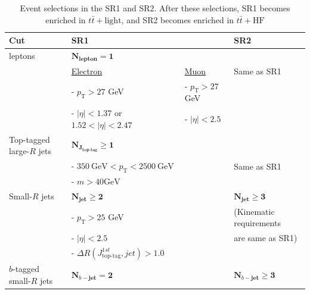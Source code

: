 \begin{table}[H]
  \centering
  \begin{tabular*}{170mm}{l|ll|l}
    \hline\hline
    Cut                       & SR1                                                         &                           & SR2\\
    \hline
    leptons                   & $\textbf{N}_{\textbf{lepton}}\mathbf{=1}$                   &                           & \\
                              & \underline{Electron}                                        & \underline{Muon}          & Same as SR1\\
                              &  - $p_{\text{T}}>27$ GeV                                    &  - $p_{\text{T}}>27$ GeV  & \\
                              &  - $|\eta|<1.37$ or $1.52<|\eta|<2.47$                      &  - $|\eta|<2.5$           & \\
    \hline
    Top-tagged large-$R$ jets & $\textbf{N}_{\mathbf{J}_{\textbf{top-tag}}}\mathbf{\geq1}$  &                           &\\
                              &  - $350~\text{GeV}<p_{\text{T}}<2500~\text{GeV}$            &                           & Same as SR1\\
                              &  - $m>40\text{GeV}$                                         &                           & \\
    \hline
    Small-$R$ jets            & $\textbf{N}_{\textbf{jet}}\mathbf{\geq 2}$                  &                           & $\textbf{N}_{\textbf{jet}}\mathbf{\geq 3}$ \\
                              &  - $p_{\text{T}}>25$ GeV                                    &                           & (Kinematic requirements\\
                              &  - $|\eta|<2.5$                                             &                           &  are same as SR1)\\
                              &  - ${\Delta}R(J_{\text{top-tag}}^{1st}, jet)>1.0$           &                           & \\
    \hline
    $b$-tagged small-$R$ jets & $\textbf{N}_{b-\textbf{jet}}\mathbf{= 2}$                   &                           & $\textbf{N}_{b-\textbf{jet}}\mathbf{\geq 3}$\\

    \hline\hline
  \end{tabular*}
  \caption{Event selections in the SR1 and SR2. After these selections, SR1 becomes enriched in $t\bar{t}+\text{light}$, and SR2 becomes enriched in $t\bar{t}+\text{HF}$}
  \label{tab:EventSelectionInSR1AndSR2}
\end{table}

